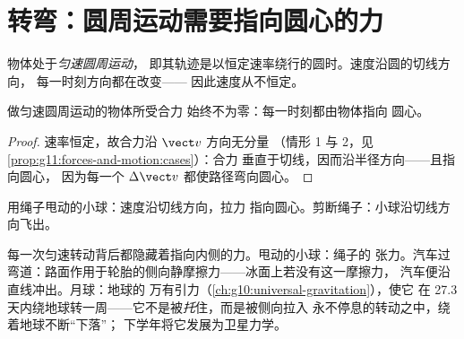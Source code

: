 \section{转弯：圆周运动需要指向圆心的力}

\begin{definition}[匀速圆周运动]\label{def:g11:forces-and-motion:ucm}
物体处于\emph{匀速圆周运动}，
即其轨迹是以恒定速率绕行的圆时。速度沿圆的切线方向，
每一时刻方向都在改变——
因此速度从不恒定。
\end{definition}

\begin{proposition}[指向圆心的力]\label{prop:g11:forces-and-motion:inward}
做匀速圆周运动的物体所受合力
始终不为零：每一时刻都由物体指向
圆心。
\end{proposition}

\begin{proof}
速率恒定，故合力沿 $\vect v$ 方向无分量
（情形 1 与 2，见\cref{prop:g11:forces-and-motion:cases}）：合力
垂直于切线，因而沿半径方向——且指向圆心，
因为每一个 $\Delta \vect v$ 都使路径弯向圆心。
\end{proof}

\begin{omfigure}

{\small 用绳子甩动的小球：速度沿切线方向，拉力
指向圆心。剪断绳子：小球沿切线方向飞出。}
\end{omfigure}

\begin{example}[绳子、弯道与月球]\label{ex:g11:forces-and-motion:moon}
每一次匀速转动背后都隐藏着指向内侧的力。甩动的小球：绳子的
张力。汽车过弯道：路面作用于轮胎的侧向静摩擦力——冰面上若没有这一摩擦力，
汽车便沿直线冲出。月球：地球的
万有引力（\cref{ch:g10:universal-gravitation}），使它
在 \num{27.3} 天内绕地球转一周——它不是被\emph{托}住，而是被侧向拉入
永不停息的转动之中，绕着地球不断“下落”；
下学年将它发展为卫星力学。
\end{example}

